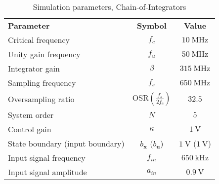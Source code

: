 
\begin{table}[htbp]
  \centering
  \caption{Simulation parameters, Chain-of-Integrators}
    \begin{tabular}{lcc}
    \rowcolor[rgb]{ 0,  0,  0} \textcolor[rgb]{ 1,  1,  1}{\textbf{Parameter}}	 & \textcolor[rgb]{ 1,  1,  1}{\textbf{Symbol}}
                             & \textcolor[rgb]{ 1,  1,  1}{\textbf{Value}}              \\
    Critical frequency       & $f_c$            & $\SI{10}{\mega\hertz}$                  \\
    Unity gain frequency     & $f_u$            & $\SI{50}{\mega\hertz}$               \\
    Integrator gain          & $\beta$          & $\SI{315}{\mega\hertz}$               \\
    Sampling frequency       & $f_s$            & $\SI{650}{\mega\hertz}$                 \\
    Oversampling ratio       & $\text{OSR} \left( \frac{f_s}{2f_c} \right)$ & $32.5$     \\
    System order             & $N$              & $5$                                     \\
    Control gain             & $\kappa$          & $\SI{1}{\volt}$                                  \\
    State boundary (input boundary)  & $b_{\bm{x}}$ ($b_{\bm{u}}$)    & $\SI{1}{\volt}$ ($\SI{1}{\volt}$)       \\
    Input signal frequency   & $f_{in}$         & $\SI{650}{\kilo\hertz}$              \\
    Input signal amplitude   & $a_{in}$         & $\SI{0.9}{\volt}$

    \end{tabular}
  \label{tab:CI_params}
\end{table}


